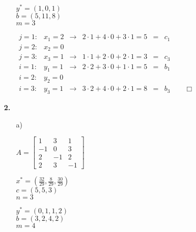 \documentclass[a4paper,11pt]{article}
\begin{document}
\begin{enumerate}
\begin{enumerate}
\begin{multicols}{3}
            \( y^* = (1, 0, 1) \)\\
            \( b = (5, 11, 8) \)\\
            \( m = 3 \)
        \end{multicols}

        \(\begin{array}{llcrcl}
            j = 1: & x_1 = 2 & \rightarrow & 2 \cdot 1 + 4 \cdot 0 + 3 \cdot 1 = 5 & = & c_1 \\
            j = 2: & x_2 = 0 \\
            j = 3: & x_3 = 1 & \rightarrow & 1 \cdot 1 + 2 \cdot 0 + 2 \cdot 1 = 3 & = & c_3 \\
            i = 1: & y_1 = 1 & \rightarrow & 2 \cdot 2 + 3 \cdot 0 + 1 \cdot 1 = 5 & = & b_1 \\
            i = 2: & y_2 = 0 \\
            i = 3: & y_3 = 1 & \rightarrow & 3 \cdot 2 + 4 \cdot 0 + 2 \cdot 1 = 8 & = & b_3 \hspace{2em} \Box
        \end{array}\)

    \end{enumerate}

\newpage
\item[\textbf{2.}]
    \begin{enumerate}
    \item[a)]
        \quad\begin{multicols}{3}
            \( A = \begin{bmatrix} 1 & 3 & 1 \\ -1 & 0 & 3 \\ 2 & -1 & 2 \\ 2 & 3 & -1 \end{bmatrix}  \)

            \( x^* = (\frac{32}{29}, \frac{8}{29}, \frac{30}{29}) \)\\
            \( c = (5, 5, 3) \)\\
            \( n = 3 \)

            \( y^* = (0, 1, 1, 2) \)\\
            \( b = (3, 2, 4, 2) \)\\
            \( m = 4 \)
        \end{multicols}


\end{enumerate}
\end{enumerate}
\end{document}
